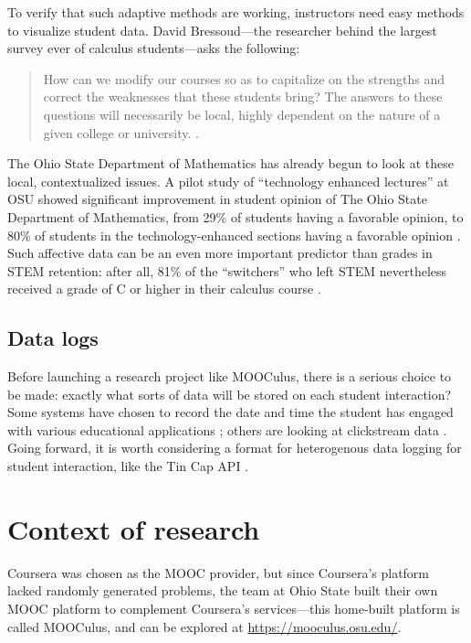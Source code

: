 \documentclass[12pt]{article}
\begin{document}
To verify that such adaptive methods are working, instructors need
easy methods to visualize student data.  David Bressoud---the
researcher behind the largest survey ever of calculus students---asks
the following:
\begin{quote}
  How can we modify our courses so as to capitalize on the strengths
  and correct the weaknesses that these students bring?  The answers
  to these questions will necessarily be local, highly dependent on
  the nature of a given college or
  university. \parencite{bressoud-sky-falling}.
\end{quote}
The Ohio State Department of Mathematics has already begun to look at
these local, contextualized issues.  A pilot study of ``technology
enhanced lectures'' at OSU showed significant improvement in student
opinion of The Ohio State Department of Mathematics, from 29\% of
students having a favorable opinion, to 80\% of students in the
technology-enhanced sections having a favorable opinion
\cite{miller-tech-enhanced-calculus}.  Such affective data can be an
even more important predictor than grades in STEM retention: after
all, 81\% of the ``switchers'' who left STEM nevertheless received a
grade of C or higher in their calculus course
\cite{calculus-programs}.

\subsection{Data logs}

Before launching a research project like MOOCulus, there is a serious
choice to be made: exactly what sorts of data will be stored on each
student interaction?  Some systems have chosen to record the date and
time the student has engaged with various educational
applications \parencite{RomeroZaldivar20121058}; others are looking at
clickstream data \parencite{boyer2013student}.  Going forward, it is
worth considering a format for heterogenous data logging for student
interaction, like the Tin Cap API \parencite{tin-can-api}.

\section{Context of research}

Coursera was chosen as the MOOC provider, but since Coursera's
platform lacked randomly generated problems, the team at Ohio State
built their own MOOC platform to complement Coursera's services---this
home-built platform is called MOOCulus, and can be explored at
\url{https://mooculus.osu.edu/}.
\end{document}
